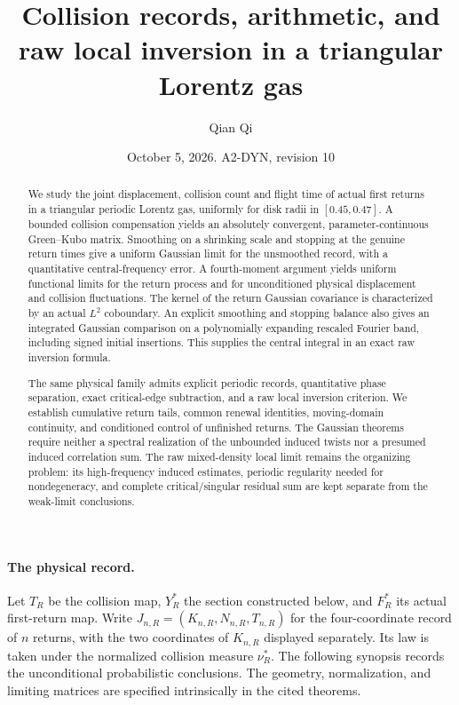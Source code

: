 \documentclass[11pt,reqno]{amsart}
\title[Collision records and raw local inversion]{Collision records, arithmetic, and raw local inversion in a triangular Lorentz gas}
\author{Qian Qi}
\date{October 5, 2026. A2-DYN, revision 10}
\numberwithin{equation}{section}
\theoremstyle{definition}\newtheorem{definition}[theorem]{Definition}
\theoremstyle{remark}\newtheorem{remark}[theorem]{Remark}
\begin{document}
\raggedbottom
\begin{abstract}
We study the joint displacement, collision count and flight time of
actual first returns in a triangular periodic Lorentz gas, uniformly
for disk radii in $[0.45,0.47]$. A bounded collision compensation yields
an absolutely convergent, parameter-continuous Green--Kubo matrix.
Smoothing on a shrinking scale and stopping at the genuine return
times give a uniform Gaussian limit for the unsmoothed record, with a
quantitative central-frequency error. A fourth-moment argument yields
uniform functional limits for the return process and for unconditioned
physical displacement and collision fluctuations. The kernel of the
return Gaussian covariance is characterized by an actual $L^2$
coboundary. An explicit smoothing and stopping balance also gives
an integrated Gaussian comparison on a polynomially expanding rescaled
Fourier band, including signed initial insertions. This supplies the
central integral in an exact raw inversion formula.

The same physical family admits explicit periodic records, quantitative
phase separation, exact critical-edge subtraction, and a raw local
inversion criterion. We establish cumulative return tails, common
renewal identities, moving-domain continuity, and conditioned control
of unfinished returns. The Gaussian theorems require neither a spectral
realization of the unbounded induced twists nor a presumed induced
correlation sum. The raw mixed-density local limit remains the organizing
problem: its high-frequency induced estimates, periodic regularity
needed for nondegeneracy, and complete critical/singular residual sum
are kept separate from the weak-limit conclusions.
\end{abstract}
\maketitle

\paragraph{The physical record.}
Let $T_R$ be the collision map, $Y_R^*$ the section constructed below,
and $F_R^*$ its actual first-return map. Write
$J_{n,R}=(K_{n,R},N_{n,R},T_{n,R})$ for the four-coordinate record of
$n$ returns, with the two coordinates of $K_{n,R}$ displayed separately.
Its law is taken under the normalized collision measure $\nu_R^*$.
The following synopsis records the unconditional probabilistic
conclusions. The geometry, normalization, and limiting matrices are
specified intrinsically in the cited theorems.
\end{document}
